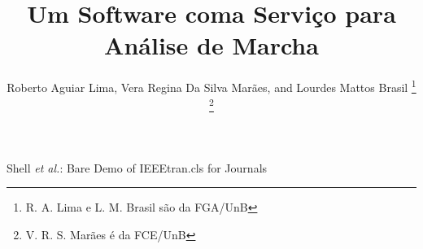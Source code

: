 \documentclass[journal]{IEEEtran}
\begin{document}
%
\title{Um Software coma Serviço para Análise de Marcha}
%
%
%

\author{Roberto Aguiar Lima,
	Vera Regina Da Silva Marães,
        and Lourdes Mattos Brasil 
\thanks{R. A. Lima e L. M. Brasil são da FGA/UnB}%
\thanks{V. R. S. Marães é da FCE/UnB}}%

% 
%



%
{Shell \MakeLowercase{\textit{et al.}}: Bare Demo of IEEEtran.cls for Journals}
% 
\end{document}
